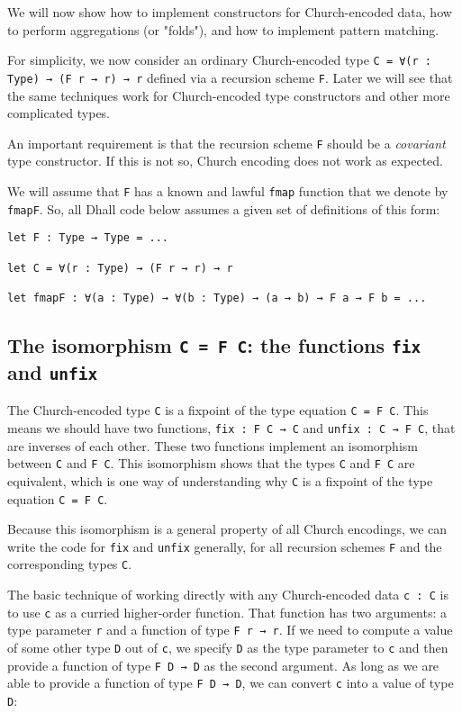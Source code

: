 We will now show how to implement constructors for Church-encoded data, how to perform aggregations (or "folds"), and how to implement pattern matching.


For simplicity, we now consider an ordinary Church-encoded type \lstinline!C = ∀(r : Type) → (F r → r) → r! defined via a recursion scheme \lstinline!F!.
Later we will see that the same techniques work for Church-encoded type constructors and other more complicated types.


An important requirement is that the recursion scheme \lstinline!F! should be a \emph{covariant} type constructor.
If this is not so, Church encoding does not work as expected.


We will assume that \lstinline!F! has a known and lawful \lstinline!fmap! function that we denote by \lstinline!fmapF!.
So, all Dhall code below assumes a given set of definitions of this form:


\begin{lstlisting}[language=Dhall]
let F : Type → Type = ...

let C = ∀(r : Type) → (F r → r) → r

let fmapF : ∀(a : Type) → ∀(b : Type) → (a → b) → F a → F b = ...
\end{lstlisting}


\subsection{The isomorphism \lstinline!C = F C!: the functions \lstinline!fix! and \lstinline!unfix! }


The Church-encoded type \lstinline!C! is a fixpoint of the type equation \lstinline!C = F C!.
This means we should have two functions, \lstinline!fix : F C → C! and \lstinline!unfix : C → F C!, that are inverses of each other.
These two functions implement an isomorphism between \lstinline!C! and \lstinline!F C!.
This isomorphism shows that the types \lstinline!C! and \lstinline!F C! are equivalent, which is one way of understanding why \lstinline!C! is a fixpoint of the type equation \lstinline!C = F C!.


Because this isomorphism is a general property of all Church encodings, we can write the code for \lstinline!fix! and \lstinline!unfix! generally, for all recursion schemes \lstinline!F! and the corresponding types \lstinline!C!.


The basic technique of working directly with any Church-encoded data \lstinline!c : C! is to use \lstinline!c! as a curried higher-order function.
That function has two arguments: a type parameter \lstinline!r! and a function of type \lstinline!F r → r!.
If we need to compute a value of some other type \lstinline!D! out of \lstinline!c!, we specify \lstinline!D! as the type parameter to \lstinline!c! and then provide a function of type \lstinline!F D → D! as the second argument.
As long as we are able to provide a function of type \lstinline!F D → D!, we can convert \lstinline!c! into a value of type \lstinline!D!:


